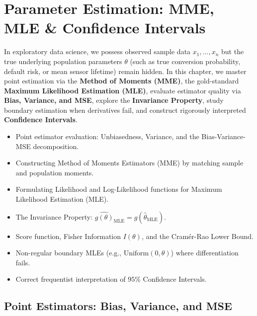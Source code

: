 \chapter{Parameter Estimation: MME, MLE \& Confidence Intervals}

In exploratory data science, we possess observed sample data $x_1, \dots, x_n$ but the true underlying population parameters $\theta$ (such as true conversion probability, default risk, or mean sensor lifetime) remain hidden. In this chapter, we master point estimation via the \textbf{Method of Moments (MME)}, the gold-standard \textbf{Maximum Likelihood Estimation (MLE)}, evaluate estimator quality via \textbf{Bias, Variance, and MSE}, explore the \textbf{Invariance Property}, study boundary estimation when derivatives fail, and construct rigorously interpreted \textbf{Confidence Intervals}.

\vspace{0.5cm}
\begin{tcolorbox}[colback=primarylight, colframe=primarydark, title={\textbf{What You'll Learn in this Chapter}}]
\begin{itemize}
    \item Point estimator evaluation: Unbiasedness, Variance, and the Bias-Variance-MSE decomposition.
    \item Constructing Method of Moments Estimators (MME) by matching sample and population moments.
    \item Formulating Likelihood and Log-Likelihood functions for Maximum Likelihood Estimation (MLE).
    \item The Invariance Property: $\widehat{g(\theta)}_{\text{MLE}} = g(\hat{\theta}_{\text{MLE}})$.
    \item Score function, Fisher Information $I(\theta)$, and the Cramér-Rao Lower Bound.
    \item Non-regular boundary MLEs (e.g., $\text{Uniform}(0, \theta)$) where differentiation fails.
    \item Correct frequentist interpretation of $95\%$ Confidence Intervals.
\end{itemize}
\end{tcolorbox}

\section{Point Estimators: Bias, Variance, and MSE}

